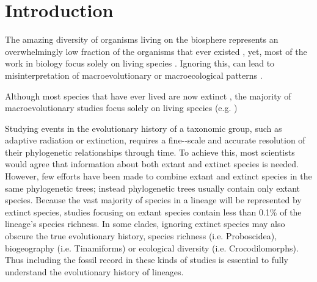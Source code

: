 \chapter{Introduction}
\label{chap:introduction}



%
% 

The amazing diversity of organisms living on the biosphere represents an overwhelmingly low fraction of the organisms that ever existed \citep{novacek1992ext,raup1993extinction}, yet, most of the work in biology focus solely on living species \citep{fritzdiversity2013}.
Ignoring this, can lead to misinterpretation of macroevolutionary or macroecological patterns \citep{jacksonwhat2006,quentaldiversity2010,dietlconservation2011,slaterunifying2013,fritzdiversity2013,benton2015}.


Although most species that have ever lived are now extinct \citep{novacek1992ext,raup1993extinction}, the majority of macroevolutionary studies focus solely on living species (e.g. \citealp{meredithimpacts2011,jetzthe2012})



Studying events in the evolutionary history of a taxonomic group, such as adaptive radiation or extinction, requires a fine-­‐scale and accurate resolution of their phylogenetic relationships through time. To achieve this, most scientists would agree that information about both extant and extinct species is needed. However, few efforts have been made to combine extant and extinct species in the same phylogenetic trees; instead phylogenetic trees usually contain only extant species. Because the vast majority of species in a lineage will be represented by extinct species, studies focusing on extant species contain less than 0.1\% of the lineage’s species richness. In some clades, ignoring extinct species may also obscure the true evolutionary history, species richness (i.e. Proboscidea), biogeography (i.e. Tinamiforms) or ecological diversity (i.e. Crocodilomorphs). Thus including the fossil record in these kinds of studies is essential to fully understand the evolutionary history of lineages.

